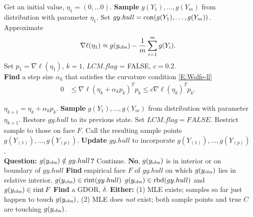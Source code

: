 {\singlespacing 
{
\noindent \begin{algorithmic}
\State Get an initial value, $\eta_1 = (0, \ldots 0)$.
\State \textbf{Sample} $g(Y_1), \ldots, g(Y_m)$ from distribution with parameter $\eta_{1}$.  
\State Set $gy.hull = \operatorname{con}(g(Y_1), \ldots, g(Y_m) )$.
\State Approximate 
\begin{align*}
\nabla \ell( \eta_1) \approx g(y_{\text{obs}}) - \frac{1}{m}\sum_{i=1}^m g(Y_i).
\end{align*}
\State Set $p_1 = \nabla \ell( \eta_1)$, $k=1$, $LCM.flag$ = FALSE, $c=0.2$.\\

\State \textbf{Find} a step size $\alpha_k$ that satisfies the curvature condition \eqref{E:Wolfe-ll}
\begin{align*}%
	 0 & \leq \nabla \ell( \eta_k + \alpha_k p_k)^T p_k \leq c \nabla \ell(\eta_k)^T p_k.
\end{align*}

\State $\eta_{k+1} = \eta_k + \alpha_k p_k$.
\State \textbf{Sample} $g(Y_1), \ldots, g(Y_m)$ from distribution with parameter $\eta_{k+1}$.
		\State Restore $gy.hull$ to its previous state.
		\State Set $LCM.flag = FALSE$.
	\Else
		\State Restrict sample to those on face $F$.
	\EndIf
\EndIf
\State Call the resulting sample points $g(Y_{(1)}), \ldots, g(Y_{(p)})$.
\State \textbf{Update} $gy.hull$ to incorporate $g(Y_{(1)}), \ldots, g(Y_{(p)}) $.\\
\State \textbf{Question: $g(y_{\text{obs}}) \notin gy.hull$?}
	\State  Continue.
\Else
\State \textbf{No}, $g(y_{\text{obs}})$ is in interior or on boundary of $gy.hull$
	\State \textbf{Find} empirical face $F$ of $gy.hull$ on which $g(y_{\text{obs}})$ 
	lies in relative interior.
		\State $g(y_{\text{obs}}) \in \operatorname{rint}( gy.hull )$ 
	\Else
	\State $g(y_{\text{obs}}) \in \operatorname{rbd}( gy.hull )$ and $g(y_{\text{obs}}) \in \operatorname{rint} F$
		\State \textbf{Find} a GDOR, $\delta$.
		\State \textbf{Either:}
		\State (1) MLE exists; samples so far just happen to touch $g(y_{\text{obs}})$, 
		\State (2) MLE does \emph{not} exist; both sample points and true $C$ are
		touching $g(y_{\text{obs}})$.


\end{algorithmic}}}
